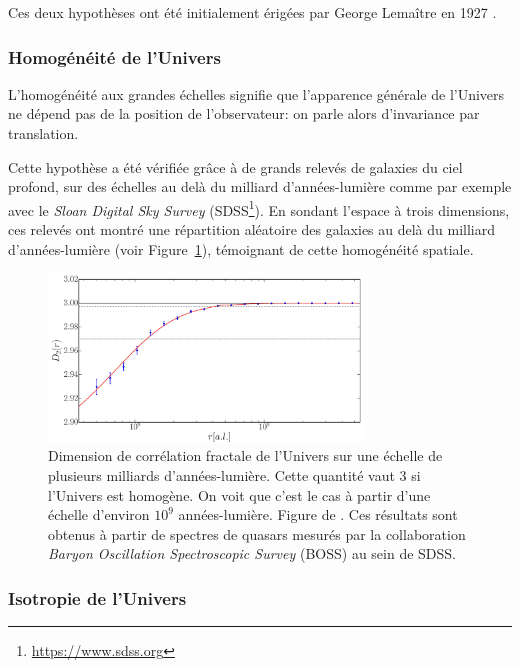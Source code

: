 \documentclass[../main/main.tex]{subfiles}
\begin{document}
Ces deux hypothèses ont été initialement érigées par George Lemaître
en 1927 \citep{Lemaitre1927}.

\subsubsection{Homogénéité de l'Univers}
L'homogénéité aux grandes échelles signifie que l'apparence générale de
l'Univers ne dépend pas de la position de l'observateur: on parle alors
d'invariance par translation.

Cette hypothèse a été vérifiée grâce à de grands relevés de galaxies du
ciel profond, sur des échelles au delà du milliard d'années-lumière
comme par exemple avec le \textit{Sloan Digital Sky Survey}
(SDSS\footnote{\url{https://www.sdss.org}}).
En sondant l'espace à trois dimensions, ces relevés ont montré une
répartition aléatoire des galaxies au delà du milliard d'années-lumière
(voir Figure~\ref{fig:homogenesdss}), témoignant de cette homogénéité spatiale.

\begin{figure}[ht]
  \centering
  \includegraphics[width=0.75\textwidth]{../figures/01_cosmology/homogeneunivers.pdf}
  \caption[Dimension de corrélation fractale de l’Univers.]{Dimension de
    corrélation fractale de l’Univers sur une échelle de plusieurs
    milliards d'années-lumière. Cette quantité vaut 3 si l’Univers est
    homogène. On voit que c’est le cas à partir d’une échelle d’environ
    $10^{9}$ années-lumière. Figure de \citet{Laurent2016}. Ces
    résultats sont obtenus à partir de spectres de quasars mesurés par
    la collaboration \textit{Baryon Oscillation Spectroscopic Survey} (BOSS) au sein de SDSS.}
\label{fig:homogenesdss}
\end{figure}

\subsubsection{Isotropie de l'Univers}
\end{document}
